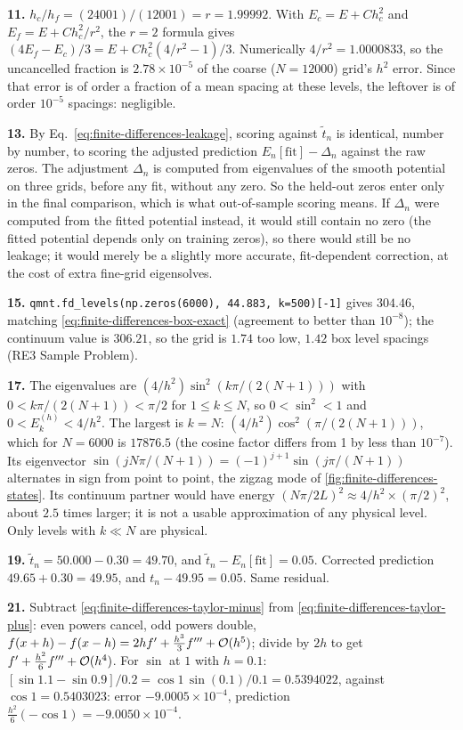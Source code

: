 \textbf{11.} $h_c/h_f=(24001)/(12001)=r=1.99992$. With $E_c=E+Ch_c^2$ and $E_f=E+Ch_c^2/r^2$, the $r=2$ formula gives $(4E_f-E_c)/3=E+Ch_c^2(4/r^2-1)/3$. Numerically $4/r^2=1.0000833$, so the uncancelled fraction is $2.78\times10^{-5}$ of the coarse ($N=12000$) grid's $h^2$ error. Since that error is of order a fraction of a mean spacing at these levels, the leftover is of order $10^{-5}$ spacings: negligible.

\textbf{13.} By Eq.~\eqref{eq:finite-differences-leakage}, scoring against $\tilde t_n$ is identical, number by number, to scoring the adjusted prediction $E_n[\mathrm{fit}]-\Delta_n$ against the raw zeros. The adjustment $\Delta_n$ is computed from eigenvalues of the smooth potential on three grids, before any fit, without any zero. So the held-out zeros enter only in the final comparison, which is what out-of-sample scoring means. If $\Delta_n$ were computed from the fitted potential instead, it would still contain no zero (the fitted potential depends only on training zeros), so there would still be no leakage; it would merely be a slightly more accurate, fit-dependent correction, at the cost of extra fine-grid eigensolves.

\textbf{15.} \texttt{qmnt.fd\_levels(np.zeros(6000), 44.883, k=500)[-1]} gives $304.46$, matching \eqref{eq:finite-differences-box-exact} (agreement to better than $10^{-8}$); the continuum value is $306.21$, so the grid is $1.74$ too low, $1.42$ box level spacings (RE3 Sample Problem).

\textbf{17.} The eigenvalues are $(4/h^2)\sin^2(k\pi/(2(N+1)))$ with $0<k\pi/(2(N+1))<\pi/2$ for $1\le k\le N$, so $0<\sin^2<1$ and $0<E^{(h)}_k<4/h^2$. The largest is $k=N$: $(4/h^2)\cos^2(\pi/(2(N+1)))$, which for $N=6000$ is $17876.5$ (the cosine factor differs from 1 by less than $10^{-7}$). Its eigenvector $\sin(jN\pi/(N+1))=(-1)^{j+1}\sin(j\pi/(N+1))$ alternates in sign from point to point, the zigzag mode of \cref{fig:finite-differences-states}. Its continuum partner would have energy $(N\pi/2L)^2\approx4/h^2\times(\pi/2)^2$, about $2.5$ times larger; it is not a usable approximation of any physical level. Only levels with $k\ll N$ are physical.

\textbf{19.} $\tilde t_n=50.000-0.30=49.70$, and $\tilde t_n-E_n[\mathrm{fit}]=0.05$. Corrected prediction $49.65+0.30=49.95$, and $t_n-49.95=0.05$. Same residual.

\textbf{21.} Subtract \eqref{eq:finite-differences-taylor-minus} from \eqref{eq:finite-differences-taylor-plus}: even powers cancel, odd powers double, $f(x+h)-f(x-h)=2hf'+\tfrac{h^3}{3}f'''+\mathcal{O}(h^5)$; divide by $2h$ to get $f'+\tfrac{h^2}{6}f'''+\mathcal{O}(h^4)$. For $\sin$ at $1$ with $h=0.1$: $[\sin1.1-\sin0.9]/0.2=\cos1\,\sin(0.1)/0.1=0.5394022$, against $\cos1=0.5403023$: error $-9.0005\times10^{-4}$, prediction $\tfrac{h^2}{6}(-\cos1)=-9.0050\times10^{-4}$.


